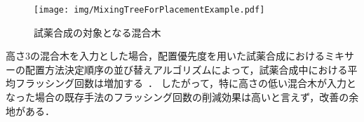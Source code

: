 

\begin{figure}[tbp]
    \centering\texttt{[image: img/MixingTreeForPlacementExample.pdf]}
 \caption{試薬合成の対象となる混合木}\label{fig:placementTree}
\end{figure}

高さ3の混合木を入力とした場合，配置優先度を用いた試薬合成におけるミキサーの配置方法決定順序の並び替えアルゴリズムによって，試薬合成中における平均フラッシング回数は増加する~\cite{10089903}．
したがって，特に高さの低い混合木が入力となった場合の既存手法のフラッシング回数の削減効果は高いと言えず，改善の余地がある．

